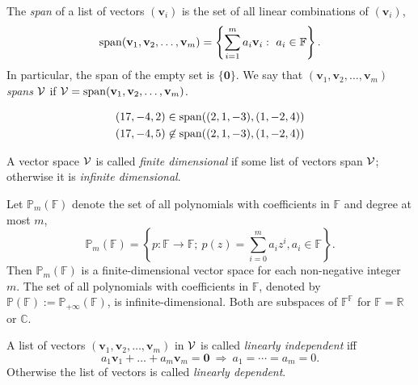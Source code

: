 \begin{defn}
  \label{def:span}
  The \emph{span} of a list of vectors $(\mathbf{v}_i)$
  is the set of all linear combinations of $(\mathbf{v}_i)$,
  \begin{equation}
    \label{eq:span}
    \mathrm{span}(\mathbf{v}_1, \mathbf{v}_2, \ldots, \mathbf{v}_m)
    = \left\{\sum_{i=1}^m a_i\mathbf{v}_i :\  a_i\in \mathbb{F}\right\}.
  \end{equation}
  In particular, the span of the empty set is $\{\mathbf{0}\}$.
  We say that $(\mathbf{v}_1, \mathbf{v}_2, \ldots, \mathbf{v}_m)$
  \emph{spans} ${\cal V}$
  if ${\cal V}=\mathrm{span}(\mathbf{v}_1, \mathbf{v}_2, \ldots, \mathbf{v}_m)$.
\end{defn}

\begin{exm}
  \begin{align*}
    (17,-4,2) &\in \mathrm{span}((2,1,-3), (1,-2,4)) \\
    (17,-4,5) &\not\in \mathrm{span}((2,1,-3), (1,-2,4))
  \end{align*}
\end{exm}

\begin{defn}
  A vector space ${\cal V}$ is called \emph{finite dimensional}
  if some list of vectors span ${\cal V}$; otherwise
  it is \emph{infinite dimensional}.
\end{defn}

\begin{exm}
  \label{exm:polynomial-spaces}
  Let $\mathbb{P}_m(\mathbb{F})$ denote the set of all polynomials
  with coefficients in $\mathbb{F}$ and degree at most $m$,
  \begin{equation}
    \label{eq:polynomialSpace}
    \mathbb{P}_m(\mathbb{F}) = \left\{
      p:\mathbb{F}\rightarrow\mathbb{F};\ 
      p(z) = \sum_{i=0}^m a_i z^i, a_i\in \mathbb{F} \right\}.
  \end{equation}
  Then $\mathbb{P}_m(\mathbb{F})$ is a finite-dimensional vector space
  for each non-negative integer $m$.
  The set of all polynomials with coefficients in $\mathbb{F}$,
  denoted by $\mathbb{P}(\mathbb{F}):=\mathbb{P}_{+\infty}(\mathbb{F})$, 
  is infinite-dimensional.
  Both are subspaces of $\mathbb{F}^{\mathbb{F}}$
  for $\mathbb{F}=\mathbb{R}$ or $\mathbb{C}$.
\end{exm}

\begin{defn}
  \label{def:linearIndependence}
  A list of vectors $(\mathbf{v}_1, \mathbf{v}_2, \ldots,
  \mathbf{v}_m)$
  in ${\cal V}$ is called \emph{linearly independent}
  iff
  \begin{equation}
    \label{eq:linearIndependent}
    a_1 \mathbf{v}_1 +\ldots + a_m \mathbf{v}_m = \mathbf{0}
    \ \Rightarrow\  a_1=\cdots=a_m=0.
  \end{equation}
  Otherwise the list of vectors is called \emph{linearly dependent}.
\end{defn}

